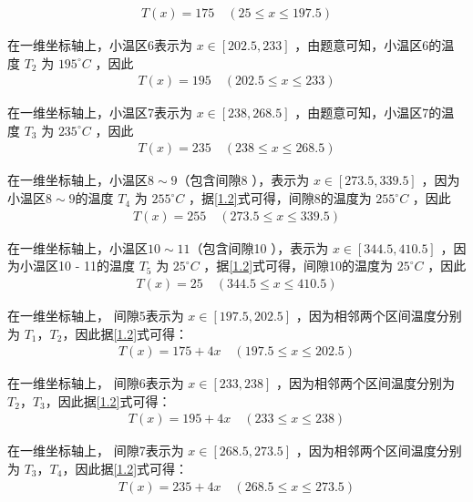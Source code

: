 \documentclass[../main.tex]{subfiles}
\begin{document}
\begin{align}\label{1.6}
T(x)=175\quad(25\leq x\leq197.5)
\end{align}
\par 在一维坐标轴上，小温区6表示为 \(x\in[202.5,233]\) ，由题意可知，小温区6的温度 \(T_{2}\) 为 \(195^{\circ}C\) ，因此
\begin{align}\label{1.7}
  T(x)=195\quad(202.5\leq x\leq233)
    \end{align}
    \par 在一维坐标轴上，小温区7表示为 \(x\in[238,268.5]\) ，由题意可知，小温区7的温度 \(T_{3}\) 为 \(235^{\circ}C\) ，因此
\begin{align}\label{1.8}
  T(x)=235\quad(238\leq x\leq268.5)
    \end{align}
\par 在一维坐标轴上，小温区$8\sim9$（包含间隙8 ），表示为 \(x\in[273.5,339.5]\) ，因为小温区$8\sim9$的温度 \(T_{4}\) 为 \(255^{\circ}C\) ，据\eqref{1.2}式可得，间隙8的温度为 \(255^{\circ}C\) ，因此
\begin{align}\label{1.9}
T(x)=255\quad(273.5\leq x\leq339.5)
    \end{align}
\par 在一维坐标轴上，小温区$10\sim11$（包含间隙10 ），表示为 \(x\in[344.5,410.5]\) ，因为小温区10 - 11的温度 \(T_{5}\) 为 \(25^{\circ}C\) ，据\eqref{1.2}式可得，间隙10的温度为 \(25^{\circ}C\) ，因此
\begin{align}\label{1.10}
    T(x)=25\quad(344.5\leq x\leq410.5)
    \end{align}
\par 在一维坐标轴上， 间隙5表示为 \(x\in[197.5,202.5]\) ，因为相邻两个区间温度分别为 \(T_1\)，\(T_2\)，因此据\eqref{1.2}式可得：
\begin{align}\label{1.11}
   T(x)=175 + 4x\quad(197.5\leq x\leq202.5)
    \end{align}
    \par 在一维坐标轴上， 间隙6表示为 \(x\in[233,238]\) ，因为相邻两个区间温度分别为 \(T_2\)，\(T_3\)，因此据\eqref{1.2}式可得：
    \begin{align}\label{1.12}
       T(x)=195 + 4x\quad(233\leq x\leq238)
        \end{align}
\par 在一维坐标轴上， 间隙7表示为 \(x\in[268.5,273.5]\) ，因为相邻两个区间温度分别为 \(T_3\)，\(T_4\)，因此据\eqref{1.2}式可得：
        \begin{align}\label{1.13}
           T(x)=235 + 4x\quad(268.5\leq x\leq273.5)
            \end{align}
\end{document}
